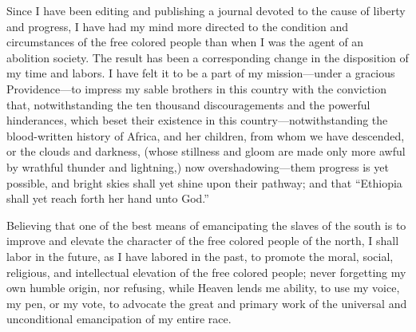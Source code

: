 Since I have been editing and publishing a journal devoted to the cause
of liberty and progress, I have had my mind more directed to the
condition and circumstances of the free colored people than when I was
the agent of an abolition society. The result has been a corresponding
change in the disposition of my time and labors. I have felt it to be a
part of my mission---under a gracious Providence---to impress my sable
brothers in this country with the conviction that, notwithstanding the
ten thousand discouragements and the powerful hinderances, which beset
their existence in this country---notwithstanding the blood-written
history of Africa, and her children, from whom we have descended, or the
clouds and darkness, (whose stillness and gloom are made only more awful
by wrathful thunder and lightning,) now overshadowing---them progress is
yet possible, and bright skies shall yet shine upon their pathway; and
that ``Ethiopia shall yet reach forth her hand unto God.''

Believing that one of the best means of emancipating the slaves of the
south is to improve and elevate the character of the free colored people
of the north, {\protect\hypertarget{406}{}{}}I shall labor in the
future, as I have labored in the past, to promote the moral, social,
religious, and intellectual elevation of the free colored people; never
forgetting my own humble origin, nor refusing, while Heaven lends me
ability, to use my voice, my pen, or my vote, to advocate the great and
primary work of the universal and unconditional emancipation of my
entire race.
